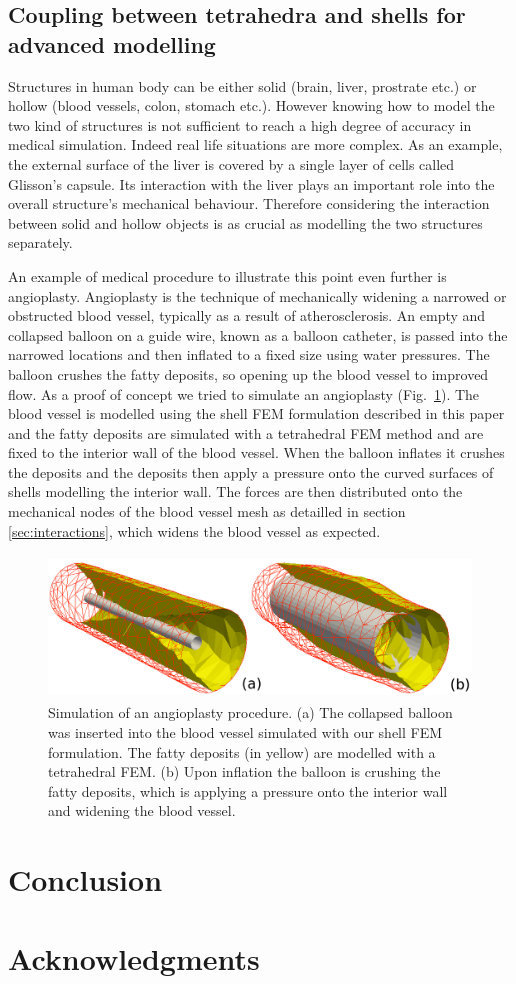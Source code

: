 \documentclass{llncs}
\begin{document}
\subsection{Coupling between tetrahedra and shells for advanced modelling}

Structures in human body can be either solid (brain, liver, prostrate etc.) or hollow (blood vessels, colon, stomach etc.). However knowing how to model the two kind of structures is not sufficient to reach a high degree of accuracy in medical simulation. Indeed real life situations are more complex. As an example, the external surface of the liver is covered by a single layer of cells called Glisson's capsule. Its interaction with the liver plays an important role into the overall structure's mechanical behaviour. Therefore considering the interaction between solid and hollow objects is as crucial as modelling the two structures separately. 

An example of medical procedure to illustrate this point even further is angioplasty. Angioplasty is the technique of mechanically widening a narrowed or obstructed blood vessel, typically as a result of atherosclerosis. An empty and collapsed balloon on a guide wire, known as a balloon catheter, is passed into the narrowed locations and then inflated to a fixed size using water pressures. The balloon crushes the fatty deposits, so opening up the blood vessel to improved flow. As a proof of concept we tried to simulate an angioplasty (Fig.~\ref{fig-stent}). The blood vessel is modelled using the shell FEM formulation described in this paper and the fatty deposits are simulated with a tetrahedral FEM method and are fixed to the interior wall of the blood vessel. When the balloon inflates it crushes the deposits and the deposits then apply a pressure onto the curved surfaces of shells modelling the interior wall. The forces are then distributed onto the mechanical nodes of the blood vessel mesh as detailled in section \ref{sec:interactions}, which widens the blood vessel as expected. 

\begin{figure}
\centering
\includegraphics[height=3.8cm]{images/angioplasty.png}
\caption {Simulation of an angioplasty procedure. (a) The collapsed balloon was inserted into the blood vessel simulated with our shell FEM formulation. The fatty deposits (in yellow) are modelled with a tetrahedral FEM. (b) Upon inflation the balloon is crushing the fatty deposits, which is applying a pressure onto the interior wall and widening the blood vessel.}
\label{fig-stent}
\end{figure}


\section{Conclusion}
\section*{Acknowledgments}



\end{document}
